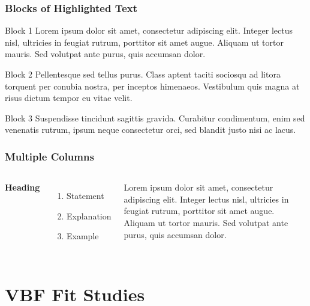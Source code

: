 \documentclass{beamer}
\begin{document}

\begin{frame}
\frametitle{Blocks of Highlighted Text}
\begin{block}{Block 1}
Lorem ipsum dolor sit amet, consectetur adipiscing elit. Integer lectus nisl, ultricies in feugiat rutrum, porttitor sit amet augue. Aliquam ut tortor mauris. Sed volutpat ante purus, quis accumsan dolor.
\end{block}

\begin{block}{Block 2}
Pellentesque sed tellus purus. Class aptent taciti sociosqu ad litora torquent per conubia nostra, per inceptos himenaeos. Vestibulum quis magna at risus dictum tempor eu vitae velit.
\end{block}

\begin{block}{Block 3}
Suspendisse tincidunt sagittis gravida. Curabitur condimentum, enim sed venenatis rutrum, ipsum neque consectetur orci, sed blandit justo nisi ac lacus.
\end{block}
\end{frame}


\begin{frame}
\frametitle{Multiple Columns}
\begin{columns}[c] %

\textbf{Heading}
\begin{enumerate}
\item Statement
\item Explanation
\item Example
\end{enumerate}

Lorem ipsum dolor sit amet, consectetur adipiscing elit. Integer lectus nisl, ultricies in feugiat rutrum, porttitor sit amet augue. Aliquam ut tortor mauris. Sed volutpat ante purus, quis accumsan dolor.

\end{columns}
\end{frame}

\section{VBF Fit Studies}
\end{document}
